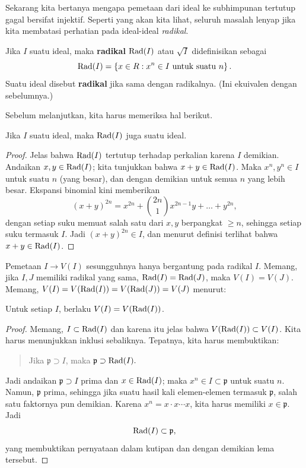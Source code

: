 Sekarang kita bertanya mengapa pemetaan dari ideal ke subhimpunan
tertutup gagal
bersifat injektif. Seperti yang akan kita lihat, seluruh masalah lenyap jika
kita membatasi perhatian pada ideal-ideal
\emph{radikal}.

\begin{definition} 
Jika $I$ suatu ideal, maka \textbf{radikal} $\operatorname{Rad}(I) $ atau $
\sqrt{I}$
didefinisikan sebagai $$\operatorname{Rad}(I) =
\left\{x \in R: x^n \in I \ \mathrm{untuk} \ \mathrm{suatu} \ n
\right\}.$$
Suatu ideal disebut \textbf{radikal} jika sama dengan radikalnya.
(Ini
ekuivalen dengan  sebelumnya.) 
\end{definition} 

Sebelum melanjutkan, kita harus memeriksa hal berikut.
\begin{lemma} 
Jika $I$ suatu ideal, maka $\operatorname{Rad}(I)$ juga suatu ideal.
\end{lemma} 
\begin{proof} 
Jelas bahwa $\operatorname{Rad}(I)$ tertutup terhadap perkalian karena $I$ demikian.
Andaikan $x,y \in \operatorname{Rad}(I)$; kita tunjukkan bahwa $x+y \in \operatorname{Rad}(I)$. Maka $x^n,
y^n \in I$
untuk suatu $n$ (yang besar), dan dengan demikian untuk semua $n$ yang lebih besar. Ekspansi binomial kini
memberikan
\[ (x+y)^{2n} = x^{2n} + \binom{2n}{1} x^{2n-1}y + \dots +
y^{2n}, \]
dengan setiap suku memuat salah satu dari $x,y$ berpangkat $ \geq n$, sehingga
setiap suku
termasuk $I$. Jadi
$(x+y)^{2n} \in I$, dan menurut definisi
terlihat bahwa $x+y \in \operatorname{Rad}(I)$.
\end{proof} 

Pemetaan $I \to V(I)$ sesungguhnya hanya bergantung pada radikal
$I$. Memang, jika $I,J$ memiliki radikal yang sama, $\operatorname{Rad}(I) =
\operatorname{Rad}(J)$, maka $V(I) = V(J)$.
Memang, $V(I) = V(\operatorname{Rad}(I)) = V(\operatorname{Rad}(J)) = V(J)$ menurut:
\begin{lemma} 
Untuk setiap $I$, berlaku $V(I) = V(\operatorname{Rad}(I))$.
\end{lemma} 
\begin{proof} 
Memang, $I \subset \operatorname{Rad}(I)$ dan karena itu jelas bahwa $V(\operatorname{Rad}(I))
\subset V(I)$. Kita harus menunjukkan
inklusi sebaliknya. Tepatnya, kita harus membuktikan:
\begin{quote}
Jika $\mathfrak{p} \supset I$, maka $\mathfrak{p} \supset
\operatorname{Rad}(I).$
\end{quote}
Jadi andaikan $\mathfrak{p} \supset I$ prima dan $x \in
\operatorname{Rad}(I)$; maka $x^n \in I \subset \mathfrak{p}$ untuk suatu $n$.
Namun, $\mathfrak{p}$ prima, sehingga jika suatu hasil kali elemen-elemen
termasuk
$\mathfrak{p}$, salah satu faktornya pun demikian. Karena $x^n = x \cdot x
\cdots x$, kita harus
memiliki $x \in \mathfrak{p}$. Jadi
\[ \operatorname{Rad}(I) \subset \mathfrak{p},  \]
yang membuktikan pernyataan dalam kutipan dan dengan demikian lema tersebut.
\end{proof} 

